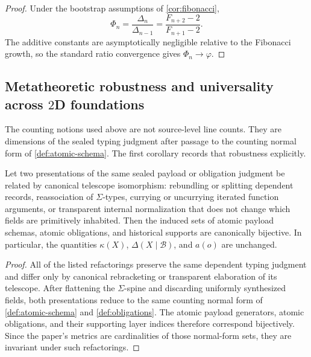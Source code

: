 \documentclass{lmcs}
\newcommand{\B}{\mathcal{B}}
\begin{document}
\begin{proof}
Under the bootstrap assumptions of \autoref{cor:fibonacci},
\[
  \Phi_n
  =
  \frac{\Delta_n}{\Delta_{n-1}}
  =
  \frac{F_{n+2}-2}{F_{n+1}-2}.
\]
The additive constants are asymptotically negligible relative to the Fibonacci growth, so the standard ratio convergence gives $\Phi_n \to \varphi$.
\end{proof}

\subsection{\texorpdfstring{Metatheoretic robustness and universality across $2$D foundations}{Metatheoretic robustness and universality across 2D foundations}}

The counting notions used above are not source-level line counts. They are dimensions of the sealed typing judgment after passage to the counting normal form of \autoref{def:atomic-schema}. The first corollary records that robustness explicitly.

\begin{cor}
\label{cor:refactoring}
Let two presentations of the same sealed payload or obligation judgment be related by canonical telescope isomorphism: rebundling or splitting dependent records, reassociation of $\Sigma$-types, currying or uncurrying iterated function arguments, or transparent internal normalization that does not change which fields are primitively inhabited. Then the induced sets of atomic payload schemas, atomic obligations, and historical supports are canonically bijective. In particular, the quantities $\kappa(X)$, $\Delta(X \mid \B)$, and $a(o)$ are unchanged.
\end{cor}

\begin{proof}
All of the listed refactorings preserve the same dependent typing judgment and differ only by canonical rebracketing or transparent elaboration of its telescope. After flattening the $\Sigma$-spine and discarding uniformly synthesized fields, both presentations reduce to the same counting normal form of \autoref{def:atomic-schema} and \autoref{def:obligations}. The atomic payload generators, atomic obligations, and their supporting layer indices therefore correspond bijectively. Since the paper's metrics are cardinalities of those normal-form sets, they are invariant under such refactorings.
\end{proof}
\end{document}
